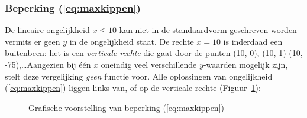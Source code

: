 \subsubsection{Beperking (\ref{eq:maxkippen})}
De lineaire ongelijkheid $x \leqslant 10$ kan niet in de standaardvorm
geschreven worden vermits er geen $y$ in de ongelijkheid staat.
De rechte  $x=10$ is inderdaad een buitenbeen:
het is een \emph{verticale rechte} die gaat door de punten (10,
0), (10, 1) (10, -75),\ldots Aangezien bij \'{e}\'{e}n $x$ oneindig
veel verschillende $y$-waarden mogelijk zijn, stelt deze vergelijking
\emph{geen} functie voor. Alle oplossingen van ongelijkheid (\ref{eq:maxkippen}) liggen links van, of op
de verticale rechte (Figuur~\ref{fig:vertrechte}):
\begin{figure}[htbp]
    \centering
{}
    \caption{Grafische voorstelling van beperking (\ref{eq:maxkippen})}
    \label{fig:vertrechte}
\end{figure}



